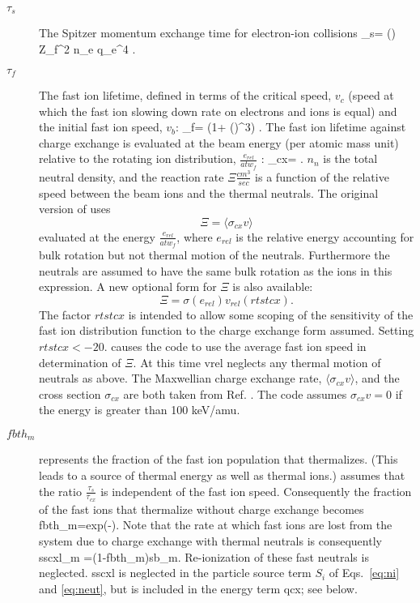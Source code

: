 \begin{description}
 \item[$\tau_s$] The
 Spitzer momentum exchange time for electron-ion collisions
 \beq
  \tau_s= \left (\right )
  {Z_f^2 n_e q_e^4} 
  \label{eq:taus}.
 \eeq
 \item[$\tau_f$] The fast ion lifetime, defined in terms of the critical speed,
 $v_c$ (speed at which the fast ion slowing down rate on electrons and ions is
 equal) and the initial fast ion speed, $v_b$:
 \beq
  \tau_f= \ln\bigg({1+
  {()^3}}\bigg) .
 \eeq
 The fast ion lifetime against charge exchange is evaluated at the beam energy
 (per atomic mass unit) relative to the rotating ion distribution,
 $\frac{e_{rel}}{atw_f}$ :
 \beq
  \tau_{cx}= .
  \label{eq:taucx}
 \eeq
 $n_n$ is the total neutral density, and the reaction rate $\Xi
 \frac{cm^3}{sec}$ is a function of the relative speed between the beam ions and
 the thermal neutrals. The original version of \ot uses
 \[
  \Xi = \langle \sigma_{cx} v \rangle
 \]
 evaluated at the energy $\frac{e_{rel}}{atw_f} $, where $e_{rel} $ is the
 relative energy accounting for bulk rotation but not thermal motion of the
 neutrals. Furthermore the neutrals are assumed to have the same bulk rotation
 as the ions in this expression.  A new optional form for $\Xi $ is also
 available:
 \[
  \Xi = \sigma(e_{rel})v_{rel}(rtstcx).
 \]
 The factor $rtstcx $ is intended to allow some scoping of the sensitivity of
 the fast ion distribution  function to  the charge exchange form assumed.
 Setting $rtstcx < -20.$ causes the code to use the average fast ion speed in
 determination of $\Xi $. At this time vrel neglects any thermal motion of
 neutrals as above.  The Maxwellian charge exchange rate, $\langle \sigma_{cx}v
 \rangle $, and the cross section $\sigma_{cx} $  are both  taken from Ref.
 \cite{Freeman:1974}. The code assumes $\sigma_{cx}v=0$ if the energy is greater
 than 100 keV/amu.  
 \item[$fbth_m$] represents the fraction of the  fast ion population that
 thermalizes. (This leads to a source of thermal energy as well as thermal
 ions.) \ot assumes that the ratio $\frac{\tau_s}{\tau_{cx}} $ is  independent
 of the fast ion speed. Consequently the fraction of the fast ions  that
 thermalize without charge exchange becomes
 \beq
  fbth_m=exp(-).
 \eeq
 Note that the rate at which fast ions are  lost from the system due to charge
 exchange with thermal neutrals is consequently
 \beq
  sscxl_m =(1-fbth_m)sb_m.
 \eeq
 Re-ionization of these fast neutrals is neglected. sscxl is neglected in the
 particle source term $S_i$ of Eqs.~\eqref{eq:ni} and \eqref{eq:neut}, but is
 included in the energy term qcx; see below. 
\end{description}

